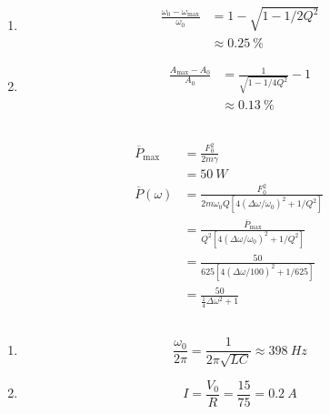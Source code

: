\documentclass{article}
\begin{document}
\begin{enumerate}
  \item

        \begin{align*}
          \frac{\omega_0 - \omega_\text{max}}{\omega_0} & = 1 - \sqrt{1 - 1 / 2 Q^2}   \\
                                                        & \approx \qty{0.25}{\percent}
        \end{align*}

  \item

        \begin{align*}
          \frac{A_\text{max} - A_0}{A_0} & = \frac{1}{\sqrt{1 - 1 / 4 Q^2}} - 1 \\
                                         & \approx \qty{0.13}{\percent}
        \end{align*}
\end{enumerate}

\subsection{}

\begin{align*}
  \overline{P}_\text{max} & = \frac{F_0^2}{2 m \gamma}                                                       \\
                          & = \qty{50}{W}                                                                    \\
  \overline{P}(\omega)    & = \frac{F_0^2}{2 m \omega_0 Q [4 (\Delta \omega / \omega_0)^2 + 1 / Q^2]}        \\
                          & = \frac{\overline{P}_\text{max}}{Q^2 [4 (\Delta \omega / \omega_0)^2 + 1 / Q^2]} \\
                          & = \frac{50}{625 [4 (\Delta \omega / 100)^2 + 1 / 625]}                           \\
                          & = \frac{50}{\frac{1}{4} \Delta \omega^2 + 1}
\end{align*}

\subsection{}

\begin{enumerate}
  \item \[\frac{\omega_0}{2 \pi} = \frac{1}{2 \pi \sqrt{L C}} \approx \qty{398}{Hz}\]

  \item \[I = \frac{V_0}{R} = \frac{15}{75} = \qty{0.2}{A}\]
\end{enumerate}
\end{document}
